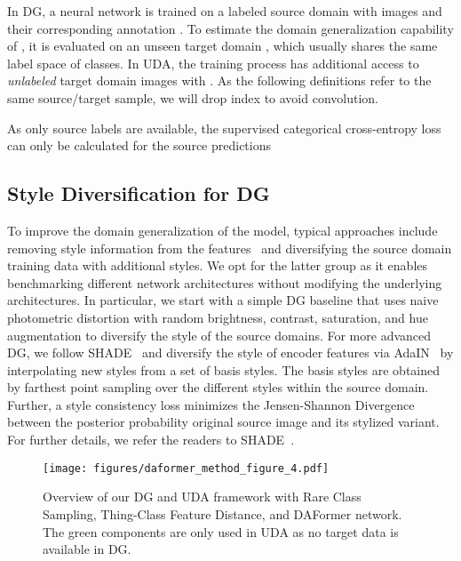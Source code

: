 \documentclass[journal,compsoc]{IEEEtran}
\begin{document}
In DG, a neural network  is trained on a labeled source domain  with images  and their corresponding annotation . To estimate the domain generalization capability of , it is evaluated on an unseen target domain , which usually shares the same label space of  classes. In UDA, the training process has additional access to \emph{unlabeled} target domain images  with . As the following definitions refer to the same source/target sample, we will drop index  to avoid convolution.

As only source labels are available, the supervised categorical cross-entropy loss can only be calculated for the source predictions 


\subsection{Style Diversification for DG}
\label{sec:methods_dg}

To improve the domain generalization of the model, typical approaches include removing style information from the features~\cite{pan2018two, choi2021robustnet} and diversifying the source domain training data with additional styles\cite{yue2019domain, peng2021global, zhao2022style}. We opt for the latter group as it enables benchmarking different network architectures without modifying the underlying architectures. In particular, we start with a simple DG baseline that uses naive photometric distortion with random brightness, contrast, saturation, and hue augmentation to diversify the style of the source domains. For more advanced DG, we follow SHADE~\cite{zhao2022style} and diversify the style of encoder features via AdaIN~\cite{huang2017arbitrary} by interpolating new styles from a set of basis styles. The basis styles are obtained by farthest point sampling over the different styles within the source domain. Further, a style consistency loss minimizes the Jensen-Shannon Divergence between the posterior probability original source image and its stylized variant. For further details, we refer the readers to SHADE~\cite{zhao2022style}.

\begin{figure*}
    \centering
    \texttt{[image: figures/daformer\_method\_figure\_4.pdf]}
    \caption{Overview of our DG and UDA framework with Rare Class Sampling, Thing-Class Feature Distance, and DAFormer network. The green components are only used in UDA as no target data is available in DG.}
    \label{fig:daformer_overview}
\end{figure*}
\end{document}
